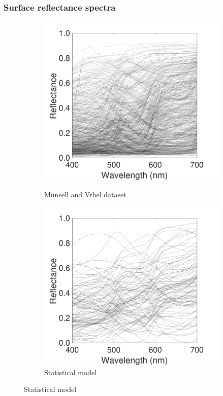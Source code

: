 \documentclass{jov}
\begin{document}
\subsubsection{Surface reflectance spectra}
\begin{figure}
\centering
	\begin{subfigure}{0.24 \textwidth}
    \centering
            \caption{Munsell and Vrhel dataset}
        \includegraphics[width=\textwidth]{../FiguresDraft5/Figure7/Figure7_a.pdf}
        \label{fig:reflectanceSpectra}
    \end{subfigure}
    \begin{subfigure}{0.24 \textwidth}
    \centering
        \caption{Statistical model}
        \includegraphics[width=\textwidth]{../FiguresDraft5/Figure7/Figure7_b.pdf}

\end{subfigure}
\end{figure}
\end{document}
